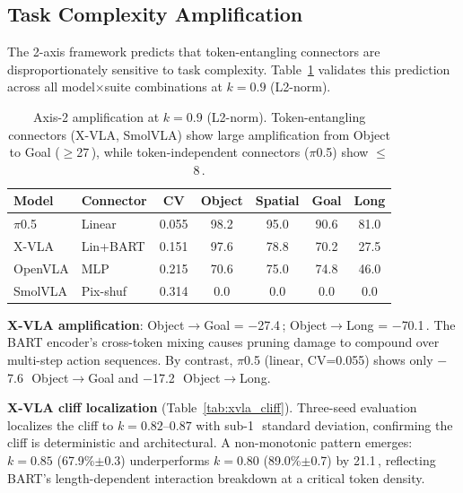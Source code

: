 \documentclass[10pt,letterpaper]{article}
\newcommand{\pp}{\,\text{pp}}
\begin{document}
\subsection{Task Complexity Amplification}
\label{sec:task_complexity}

The 2-axis framework predicts that token-entangling connectors are disproportionately sensitive to task complexity. Table~\ref{tab:crosssuite_amplification} validates this prediction across all model$\times$suite combinations at $k\!=\!0.9$ (L2-norm).

\begin{table}[t]
\centering
\caption{Axis-2 amplification at $k\!=\!0.9$ (L2-norm). Token-entangling connectors (X-VLA, SmolVLA) show large amplification from Object to Goal ($\geq$27\pp), while token-independent connectors ($\pi$0.5) show $\leq$8\pp.}
\label{tab:crosssuite_amplification}
\small
\begin{tabular}{llccccc}
\toprule
Model & Connector & CV & Object & Spatial & Goal & Long \\
\midrule
$\pi$0.5 & Linear & 0.055 & 98.2 & 95.0 & 90.6 & 81.0 \\
X-VLA & Lin+BART & 0.151 & 97.6 & 78.8 & 70.2 & 27.5 \\
OpenVLA & MLP & 0.215 & 70.6 & 75.0 & 74.8 & 46.0 \\
SmolVLA & Pix-shuf & 0.314 & 0.0 & 0.0 & 0.0 & 0.0 \\
\bottomrule
\end{tabular}
\end{table}

\textbf{X-VLA amplification}: Object$\to$Goal = $-$27.4\pp; Object$\to$Long = $-$70.1\pp. The BART encoder's cross-token mixing causes pruning damage to compound over multi-step action sequences. By contrast, $\pi$0.5 (linear, CV=0.055) shows only $-$7.6\pp\ Object$\to$Goal and $-$17.2\pp\ Object$\to$Long.

\textbf{X-VLA cliff localization} (Table~\ref{tab:xvla_cliff}). Three-seed evaluation localizes the cliff to $k\!=\!0.82$--$0.87$ with sub-1\pp\ standard deviation, confirming the cliff is deterministic and architectural. A non-monotonic pattern emerges: $k\!=\!0.85$ (67.9\%$\pm$0.3) underperforms $k\!=\!0.80$ (89.0\%$\pm$0.7) by 21.1\pp, reflecting BART's length-dependent interaction breakdown at a critical token density.
\end{document}
